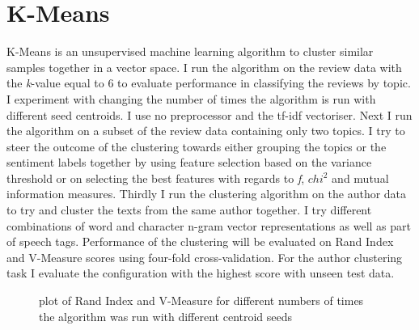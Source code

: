 \documentclass[11pt]{article}
\begin{document}
\section{K-Means}

K-Means is an unsupervised machine learning algorithm to cluster similar samples together in a vector space. I run the algorithm on the review data with the \emph{k}-value equal to 6 to evaluate performance in classifying the reviews by topic. I experiment with changing the number of times the algorithm is run with different seed centroids. I use no preprocessor and the tf-idf vectoriser. Next I run the algorithm on a subset of the review data containing only two topics. I try to steer the outcome of the clustering towards either grouping the topics or the sentiment labels together by using feature selection based on the variance threshold or on selecting the best features with regards to \emph{f}, \emph{$chi^2$} and mutual information measures. Thirdly I run the clustering algorithm on the author data to try and cluster the texts from the same author together. I try different combinations of word and character n-gram vector representations as well as part of speech tags. Performance of the clustering will be evaluated on Rand Index and V-Measure scores using four-fold cross-validation. For the author clustering task I evaluate the configuration with the highest score with unseen test data.

\begin{figure}
  \caption{plot of Rand Index and V-Measure for different numbers of times the algorithm was run with different centroid seeds}
  \label{fig:k-seeds}
\end{figure}
\end{document}
